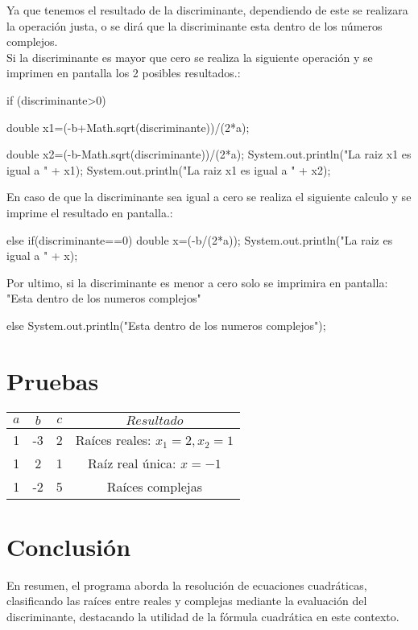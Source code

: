 \documentclass{IEEEcsmag}
\begin{document}
Ya que tenemos el resultado de la discriminante, dependiendo de este se realizara la operación justa, o se dirá que la discriminante esta dentro de los números complejos.\\
Si la discriminante es mayor que cero se realiza la siguiente operación y se imprimen en pantalla los 2 posibles resultados.:
\begin{javaCode}
    if (discriminante>0) {
            double x1=(-b+Math.sqrt(discriminante))/(2*a);
            
            double x2=(-b-Math.sqrt(discriminante))/(2*a);
            System.out.println("La raiz x1 es igual a " + x1);
            System.out.println("La raiz x1 es igual a " + x2);
            
        }
\end{javaCode}
En caso de que la discriminante sea igual a cero se realiza el siguiente calculo y se imprime el resultado en pantalla.:
\begin{javaCode}
    else if(discriminante==0){
            double x=(-b/(2*a));
            System.out.println("La raiz es igual a " + x);
        }
\end{javaCode}
Por ultimo, si la discriminante es menor a cero solo se imprimira en pantalla:\\"Esta dentro de los numeros complejos"
\begin{javaCode}
    else{
            System.out.println("Esta dentro de los numeros complejos");
        }
\end{javaCode}

\section{Pruebas}
\begin{center}
\begin{tabular}{|c|c|c|c|}
\hline
\textbf{\(a\)} & \textbf{\(b\)} & \textbf{\(c\)} & \textbf{\(Resultado\)} \\
\hline
1 & -3 & 2 & Raíces reales: \(x_1 = 2, x_2 = 1\) \\
\hline
1 & 2 & 1 & Raíz real única: \(x = -1\) \\
\hline
1 & -2 & 5 & Raíces complejas \\
\hline
\end{tabular}
\end{center}

\section{Conclusión}
En resumen, el programa aborda la resolución de ecuaciones cuadráticas, clasificando las raíces entre reales y complejas mediante la evaluación del discriminante, destacando la utilidad de la fórmula cuadrática en este contexto.
\end{document}
